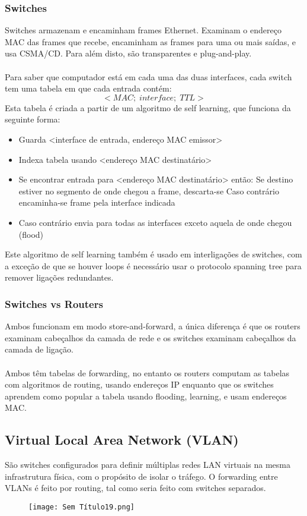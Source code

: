 \documentclass[10pt,a4paper]{report}
\begin{document}
\subsubsection{Switches}
Switches armazenam e encaminham frames Ethernet. Examinam o endereço MAC das frames que recebe, encaminham as frames para uma ou mais saídas, e usa CSMA/CD. Para além disto, são transparentes e plug-and-play.\\
\\
Para saber que computador está em cada uma das duas interfaces, cada switch tem uma tabela em que cada entrada contém:
$$
<MAC;\;interface;\;TTL>
$$
Esta tabela é criada a partir de um algoritmo de self learning, que funciona da seguinte forma:
\begin{itemize}
\item Guarda <interface de entrada, endereço MAC emissor>
\item Indexa tabela usando <endereço MAC destinatário>
\item Se encontrar entrada para <endereço MAC destinatário> então:
\subitem Se destino estiver no segmento de onde chegou a frame, descarta-se
\subitem Caso contrário encaminha-se frame pela interface indicada
\item Caso contrário envia para todas as interfaces exceto aquela de onde chegou (flood)
\end{itemize}
Este algoritmo de self learning também é usado em interligações de switches, com a exceção de que  se houver loops é necessário usar o protocolo spanning tree para remover ligações redundantes.
\subsubsection{Switches vs Routers}
Ambos funcionam em modo store-and-forward, a única diferença é que os routers examinam cabeçalhos da camada de rede e os switches examinam cabeçalhos da camada de ligação.\\
\\
Ambos têm tabelas de forwarding, no entanto os routers  computam as tabelas com algoritmos de routing, usando endereços IP enquanto que os switches aprendem como popular a tabela usando flooding, learning, e usam endereços MAC.
\subsection{Virtual Local Area Network (VLAN)}
São switches configurados para definir múltiplas redes LAN virtuais na mesma infrastrutura física, com o propósito de isolar o tráfego. O forwarding entre VLANs é feito por routing, tal como seria feito com switches separados.
\begin{figure}[H]
\centering
\texttt{[image: Sem Título19.png]}
\end{figure}
\end{document}

